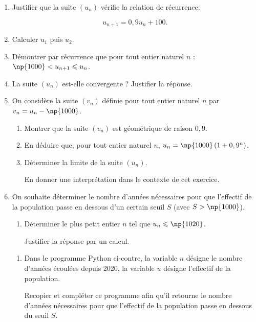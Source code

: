 \begin{enumerate}
\item Justifier que la suite $\left(u_n\right)$ vérifie la relation de récurrence:

\[u_{n+1} = 0,9u_n + 100.\]

\item Calculer $u_1$ puis $u_2$.
\item Démontrer par récurrence que pour tout entier naturel $n$ :\: $\np{1000} < u_{n+1}  \leqslant u_n$.
\item La suite $\left(u_n\right)$ est-elle convergente ? Justifier la réponse.
\item On considère la suite $\left(v_n\right)$ définie pour tout entier naturel $n$ par $v_n = u_n - \np{1000}$.
	\begin{enumerate}
		\item Montrer que la suite $\left(v_n\right)$ est géométrique de raison $0,9$.
		\item En déduire que, pour tout entier naturel $n$,\: $u_n = \np{1000} \left(1 + 0,9^n\right)$.
		\item Déterminer la limite de la suite $\left(u_n\right)$.
		
En donner une interprétation dans le contexte de cet exercice.
	\end{enumerate}

\item On souhaite déterminer le nombre d'années nécessaires pour que l'effectif de la population passe en dessous d'un certain seuil $S$ (avec $S > \np{1000}$).
	\begin{enumerate}
		\item Déterminer le plus petit entier $n$ tel que $u_n \leqslant \np{1020}$.

Justifier la réponse par un calcul.
	\end{enumerate}
\begin{minipage}{0.58\linewidth}
	\begin{enumerate}[resume]
		\item Dans le programme Python ci-contre, la variable $n$ désigne le nombre d'années écoulées depuis 2020, la variable $u$ désigne l'effectif de la population. 
		
Recopier et compléter ce programme afin qu'il retourne le nombre d'années nécessaires pour que l'effectif de la population passe en dessous du seuil $S$.
	\end{enumerate}


\end{minipage}
\end{enumerate}
